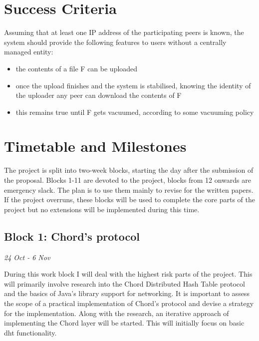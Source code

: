 \documentclass[12pt]{article}
\begin{document}
\section{Success Criteria}

Assuming that at least one IP address of the participating peers is known, the system should provide the following features to users without a centrally managed entity:

\begin{itemize}
\item{the contents of a file F can be uploaded}
\item{once the upload finishes and the system is stabilised, knowing the identity of the uploader any peer can download the contents of F}
\item{this remains true until F gets vacuumed, according to some vacuuming policy}
\end{itemize}

\section{Timetable and Milestones}

The project is split into two-week blocks, starting the day after the submission of the proposal. Blocks 1-11 are devoted to the project, blocks from 12 onwards are emergency slack. The plan is to use them mainly to revise for the written papers. If the project overruns, these blocks will be used to complete the core parts of the project but no extensions will be implemented during this time.


\subsection{Block 1: Chord's protocol}
\emph{24 Oct - 6 Nov}  %

During this work block I will deal with the highest risk parts of the project. This will primarily involve research into the Chord Distributed Hash Table protocol and the basics of Java's library support for networking. It is important to assess the scope of a practical implementation of Chord's protocol and devise a strategy for the implementation. Along with the research, an iterative approach of implementing the Chord layer will be started. This will initially focus on basic \gls{dht} functionality.

\end{document}

